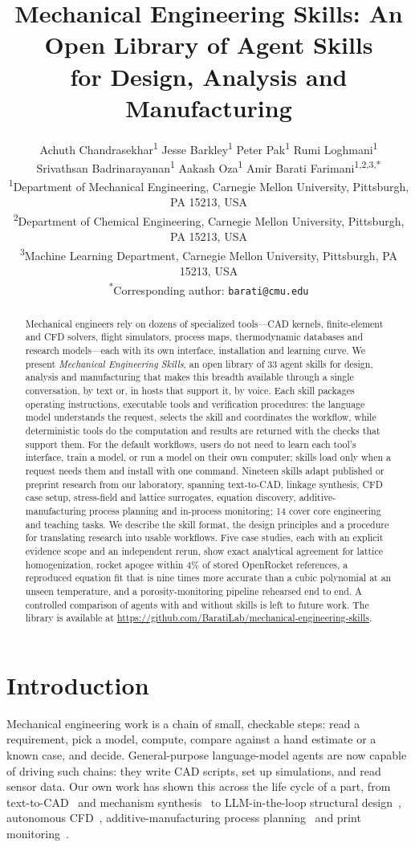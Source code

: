 \documentclass[11pt]{article}
\title{\textbf{Mechanical Engineering Skills: An Open Library of Agent Skills\\ for Design, Analysis and Manufacturing}}
\author{
Achuth Chandrasekhar\textsuperscript{1} \quad Jesse Barkley\textsuperscript{1} \quad Peter Pak\textsuperscript{1} \quad Rumi Loghmani\textsuperscript{1} \\
Srivathsan Badrinarayanan\textsuperscript{1} \quad Aakash Oza\textsuperscript{1} \quad Amir Barati Farimani\textsuperscript{1,2,3,*} \\[6pt]
\small \textsuperscript{1}Department of Mechanical Engineering, Carnegie Mellon University, Pittsburgh, PA 15213, USA \\
\small \textsuperscript{2}Department of Chemical Engineering, Carnegie Mellon University, Pittsburgh, PA 15213, USA \\
\small \textsuperscript{3}Machine Learning Department, Carnegie Mellon University, Pittsburgh, PA 15213, USA \\[2pt]
\small \textsuperscript{*}Corresponding author: \texttt{barati@cmu.edu}
}
\date{}
\begin{document}
\maketitle

\begin{abstract}
Mechanical engineers rely on dozens of specialized tools---CAD kernels, finite-element and CFD
solvers, flight simulators, process maps, thermodynamic databases and research models---each with
its own interface, installation and learning curve. We present \emph{Mechanical Engineering
Skills}, an open library of 33 agent skills for design, analysis and manufacturing that makes this
breadth available through a single conversation, by text or, in hosts that support it, by voice.
Each skill packages operating instructions, executable tools and verification procedures: the
language model understands the request, selects the skill and coordinates the workflow, while
deterministic tools do the computation and results are returned with the checks that support them.
For the default workflows, users do not need to learn each tool's interface, train a model, or run
a model on their own computer; skills load only when a request needs them and install with one
command. Nineteen skills adapt published or preprint research from our laboratory, spanning
text-to-CAD, linkage synthesis, CFD case setup, stress-field and lattice surrogates, equation
discovery, additive-manufacturing process planning and in-process monitoring; 14 cover core
engineering and teaching tasks. We describe the skill format, the design principles and a procedure
for translating research into usable workflows. Five case studies, each with an explicit evidence
scope and an independent rerun, show exact analytical agreement for lattice homogenization, rocket
apogee within 4\% of stored OpenRocket references, a reproduced equation fit that is nine times more
accurate than a cubic polynomial at an unseen temperature, and a porosity-monitoring pipeline
rehearsed end to end. A controlled comparison of agents with and without skills is left to future
work. The library is available at
\url{https://github.com/BaratiLab/mechanical-engineering-skills}.
\end{abstract}

\section{Introduction}
Mechanical engineering work is a chain of small, checkable steps: read a requirement, pick a
model, compute, compare against a hand estimate or a known case, and decide. General-purpose
language-model agents are now capable of driving such chains: they write CAD scripts, set up
simulations, and read sensor data. Our own work has shown this across the life cycle of a part,
from text-to-CAD~\cite{barkley2026cadsmith,badagabettu2024query2cad} and mechanism
synthesis~\cite{jadhav2026linkd} to LLM-in-the-loop structural design~\cite{jadhav2026designer},
autonomous CFD~\cite{oza2026cfdforge}, additive-manufacturing process
planning~\cite{pak2025additivellm,pak2026alloy,pak2026sls} and print
monitoring~\cite{jadhav2025llm3dprint}.
\end{document}
